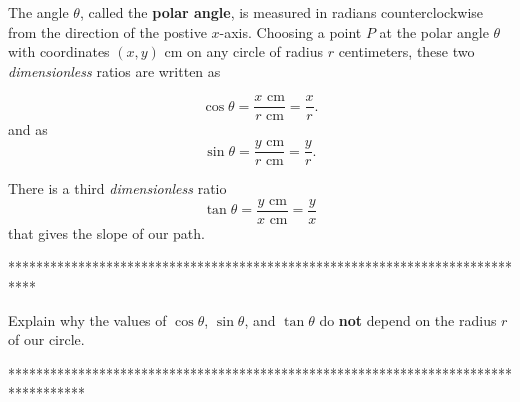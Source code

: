 \documentclass{ximera}
\begin{document}
\begin{question}
The angle $\theta$, called the {\bf polar angle}, is measured in radians counterclockwise from the direction of the postive $x$-axis. Choosing a point $P$ at the polar angle $\theta$ with coordinates $(x,y)$ cm on any circle of radius $r$ centimeters, these two \emph{dimensionless} ratios are written as

\[
   \cos \theta = \frac{x \text{ cm}}{r \text{ cm}} = \frac{x}{r} .
\]
and as
\[
   \sin \theta = \frac{y \text{ cm}}{r \text{ cm}} = \frac{y}{r} .
\]

There is a third \emph{dimensionless} ratio 
\[
  \tan \theta = \frac{y \text{ cm}}{x \text{ cm}} = \frac{y}{x}
\]
that gives the slope of our path. 


\end{question}

****************************************************************************

\fi

\begin{question} \label{Q1:Cosine}
Explain why the values of $\cos \theta$, $\sin\theta$, and $\tan\theta$ do {\bf not} depend on the radius $r$ of our circle. 
\end{question}


\iffalse

***********************************************************************************
\end{document}
